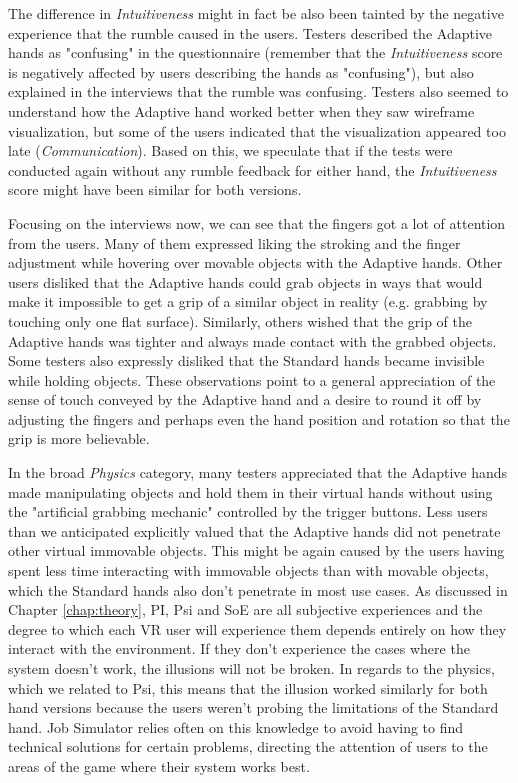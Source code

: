 The difference in \textit{Intuitiveness} might in fact be also been tainted by the negative experience that the rumble caused in the users. Testers described the Adaptive hands as "confusing" in the questionnaire (remember that the \textit{Intuitiveness} score is negatively affected by users describing the hands as "confusing"), but also explained in the interviews that the rumble was confusing. Testers also seemed to understand how the Adaptive hand worked better when they saw wireframe visualization, but some of the users indicated that the visualization appeared too late (\textit{Communication}). Based on this, we speculate that if the tests were conducted again without any rumble feedback for either hand, the \textit{Intuitiveness} score might have been similar for both versions. 

Focusing on the interviews now, we can see that the fingers got a lot of attention from the users. Many of them expressed liking the stroking and the finger adjustment while hovering over movable objects with the Adaptive hands. Other users disliked that the Adaptive hands could grab objects in ways that would make it impossible to get a grip of a similar object in reality (e.g. grabbing by touching only one flat surface). Similarly, others wished that the grip of the Adaptive hands was tighter and always made contact with the grabbed objects. Some testers also expressly disliked that the Standard hands became invisible while holding objects. These observations point to a general appreciation of the sense of touch conveyed by the Adaptive hand and a desire to round it off by adjusting the fingers and perhaps even the hand position and rotation so that the grip is more believable.


In the broad \textit{Physics} category, many testers appreciated that the Adaptive hands made manipulating objects and hold them in their virtual hands without using the "artificial grabbing mechanic" controlled by the trigger buttons. Less users than we anticipated explicitly valued that the Adaptive hands did not penetrate other virtual immovable objects. This might be again caused by the users having spent less time interacting with immovable objects than with movable objects, which the Standard hands also don't penetrate in most use cases. As discussed in Chapter \ref{chap:theory}, PI, Psi and SoE are all subjective experiences and the degree to which each VR user will experience them depends entirely on how they interact with the environment. If they don't experience the cases where the system doesn't work, the illusions will not be broken. In regards to the physics, which we related to Psi, this means that the illusion worked similarly for both hand versions because the users weren't probing the limitations of the Standard hand. Job Simulator relies often on this knowledge to avoid having to find technical solutions for certain problems, directing the attention of users to the areas of the game where their system works best.


